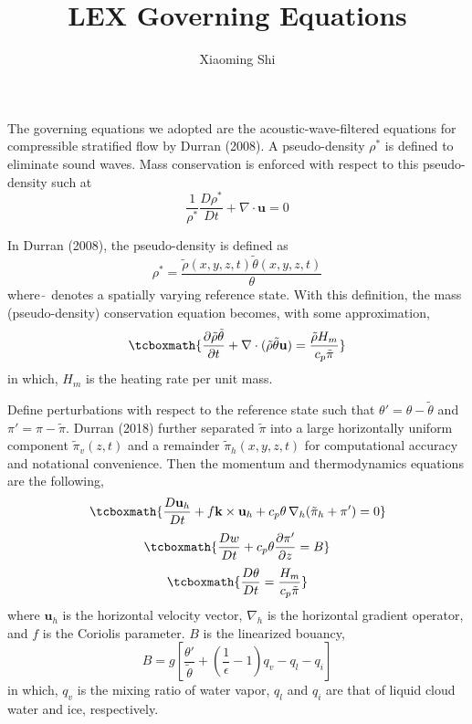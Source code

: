 \documentclass[a4paper,11pt]{article}
\title{\textbf{LEX Governing Equations}}
\author{Xiaoming Shi}
\begin{document}
\maketitle

The governing equations we adopted are the acoustic-wave-filtered equations for compressible stratified flow by Durran (2008). A pseudo-density $\rho^*$ is defined to eliminate sound waves. Mass conservation is enforced with respect to this pseudo-density such at
\begin{equation}
 \frac{1}{\rho^*} \frac{D \rho^*}{D t} + \nabla\cdot \mathbf{u} = 0 \nonumber
\end{equation}

In Durran (2008), the pseudo-density is defined as 
\begin{equation}
 \rho^* = \frac{\tilde{\rho}(x,y,z,t)\tilde{\theta}(x,y,z,t)}{\theta} \nonumber 
\end{equation}
where $\tilde{\ }$ denotes a spatially varying reference state. With this definition, the mass (pseudo-density) conservation equation becomes, with some approximation,
\begin{equation}
\tcboxmath{
\frac{\partial \tilde{\rho} \tilde{\theta}}{\partial t} + \nabla\cdot (\tilde{\rho}\tilde{\theta}\mathbf{u}) = \frac{\tilde{\rho} H_m}{c_p \tilde{\pi}}
}
\end{equation}
in which, $H_m$ is the heating rate per unit mass. 

Define perturbations with respect to the reference state such that $\theta' = \theta - \tilde{\theta}$ and $\pi' = \pi - \tilde{\pi}$. Durran (2018) further separated $\tilde{\pi}$ into a large horizontally uniform component $\tilde{\pi}_v(z,t)$ and a remainder $\tilde{\pi}_h(x,y,z,t)$ for computational accuracy and notational convenience. Then the momentum and thermodynamics equations are the following,
\begin{equation}
\tcboxmath{
\frac{D \mathbf{u}_h}{D t}  + f {\mathbf{k}} \times \mathbf{u}_h +  c_p \theta\,\nabla_h(\tilde{\pi}_h + \pi') = 0
}
\end{equation}
\begin{equation}
 \tcboxmath{
 \frac{D w}{D t} + c_p \theta \frac{\partial \pi'}{\partial z} = B%
 }
\end{equation}
\begin{equation}
\tcboxmath{
 \frac{D \theta }{D t} = \frac{H_m}{c_p \tilde{\pi}}
 }
\end{equation}
where $\mathbf{u}_h$ is the horizontal velocity vector, $\nabla_h$ is the horizontal gradient operator, and $f$ is the Coriolis parameter. $B$ is the linearized bouancy,
\begin{equation}
B = g\left[\frac{\theta'}{\tilde{\theta}} + \left(\frac{1}{\epsilon}-1 \right)q_v - q_l- q_i\right]
\end{equation}
in which, $q_v$ is the mixing ratio of water vapor, $q_l$ and $q_i$ are that of liquid cloud water and ice, respectively.
\end{document}
